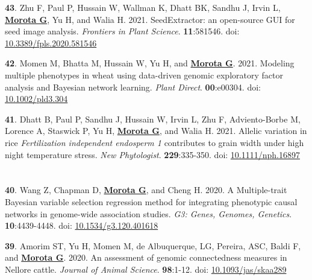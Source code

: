\documentclass[margin,line,10pt]{res}
\newenvironment{list1}{
  \begin{list}{\ding{113}}{%
      \setlength{\itemsep}{0in}
      \setlength{\parsep}{0in} \setlength{\parskip}{0in}
      \setlength{\topsep}{0in} \setlength{\partopsep}{0in} 
      \setlength{\leftmargin}{0.17in}}}{\end{list}}
\begin{document}
\begin{resume}
\begin{list1}
  \item [{\bf 43}.] Zhu F, Paul P, Hussain W, Wallman K, Dhatt BK, Sandhu J, Irvin L, \textbf{\underline{Morota G}}, Yu H, and Walia H. 2021. SeedExtractor: an open-source GUI for seed image analysis. \emph{Frontiers in Plant Science}. \textbf{11}:581546. doi: \textcolor{blue}{\href{https://doi.org/10.3389/fpls.2020.581546}{10.3389/fpls.2020.581546}}

    \vspace{0.5cm}
    
\item [{\bf 42}.] Momen M, Bhatta M, Hussain W, Yu H, and \textbf{\underline{Morota G}}. 2021. Modeling multiple phenotypes in wheat using data-driven genomic exploratory factor analysis and Bayesian network learning. \emph{Plant Direct}. \textbf{00}:e00304. doi: \textcolor{blue}{\href{https://doi.org/10.1002/pld3.304}{10.1002/pld3.304}}

      \vspace{0.5cm}

  \item [{\bf 41}.] Dhatt B, Paul P, Sandhu J, Hussain W, Irvin L, Zhu F, Adviento-Borbe M, Lorence A, Staswick P, Yu H, \textbf{\underline{Morota G}}, and Walia H. 2021. Allelic variation in rice \textit{Fertilization independent endosperm 1} contributes to grain width under high night temperature stress. \emph{New Phytologist}. \textbf{229}:335-350. doi: \textcolor{blue}{\href{https://doi.org/10.1111/nph.16897}{10.1111/nph.16897}}

  
\end{list1}


\section{}
\begin{list1}

  \item [{\bf 40}.] Wang Z, Chapman D, \textbf{\underline{Morota G}}, and Cheng H. 2020. A Multiple-trait Bayesian variable selection regression method for integrating phenotypic causal networks in genome-wide association studies. \emph{G3: Genes, Genomes, Genetics}. \textbf{10}:4439-4448. doi: \textcolor{blue}{\href{https://doi.org/10.1534/g3.120.401618}{10.1534/g3.120.401618}}

  \vspace{0.5cm}

\item [{\bf 39}.] Amorim ST, Yu H, Momen M, de Albuquerque, LG, Pereira, ASC, Baldi F, and \textbf{\underline{Morota G}}. 2020. An assessment of genomic connectedness measures in Nellore cattle. \emph{Journal of Animal Science}.  \textbf{98}:1-12.  doi: \textcolor{blue}{\href{https://doi.org/10.1093/jas/skaa289}{10.1093/jas/skaa289}} 


\end{list1}
\end{resume}
\end{document}

